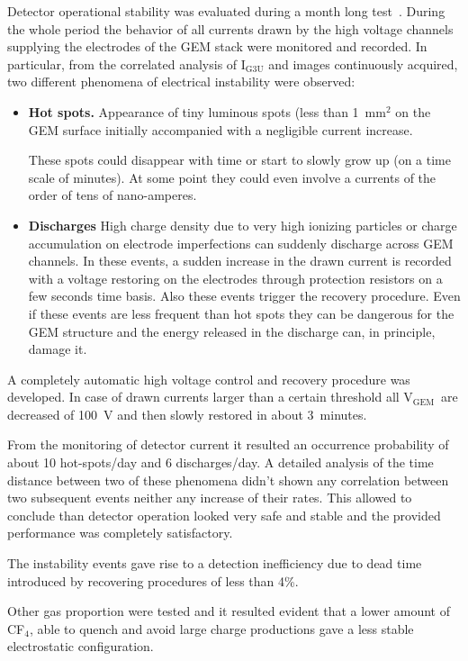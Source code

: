 \documentclass[review]{elsarticle}
\newcommand{\Ig}  {I$_{\mathrm{G3U}}$\xspace}
\newcommand{\Vg}  {V$_{\mathrm{GEM}}$\xspace}
\begin{document}
Detector operational stability was evaluated during a month long test~\cite{bib:fe55New}. 
During the whole period the behavior of all currents drawn by the high voltage channels supplying the electrodes of the GEM stack were monitored and recorded.
In particular, from the correlated analysis of \Ig and images continuously acquired, two different phenomena of electrical instability were observed:

\begin{itemize}
\item {\bf Hot spots.} Appearance of tiny luminous spots (less than 1~mm$^2$ on the GEM surface initially accompanied with a negligible current increase.

These spots could disappear with time or start to slowly grow up (on a time scale of minutes). At some point they could even involve a currents of the order of tens of nano-amperes.

\item{\bf Discharges} High charge density due to very high ionizing particles or charge accumulation on electrode imperfections can suddenly discharge across GEM channels. In these events, a sudden increase in the drawn current is recorded with a voltage restoring on the electrodes through protection resistors on a few seconds time basis. Also these events trigger the recovery procedure.
Even if these events are less frequent than hot spots 
they can be dangerous for the GEM structure and the energy released in the discharge can, in principle, damage it.

\end{itemize}

A completely automatic high voltage control and recovery procedure was developed. In case of drawn currents larger than a certain threshold all \Vg\ are decreased of 100~V and then slowly restored in about 3~minutes.

From the monitoring of detector current it resulted an occurrence probability of about 10 hot-spots/day and 6 discharges/day.
A detailed analysis of the time distance between two of these phenomena didn't shown any correlation between two subsequent events neither any increase of their rates. This allowed to conclude than
detector operation looked very safe and stable and the provided performance was completely satisfactory. 

The instability events gave rise to a detection inefficiency due to dead time introduced by recovering procedures of less than 4\%.

Other gas proportion were tested and it resulted evident that a lower amount of CF$_4$, able to quench and avoid large charge productions gave a less stable electrostatic configuration. 
\end{document}
